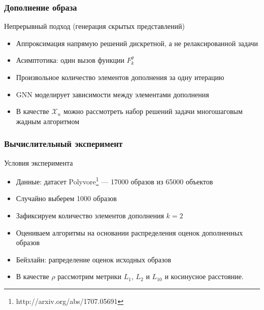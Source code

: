 \documentclass[10pt]{beamer}
\begin{document}
\begin{frame}
	\frametitle{Дополнение образа}
	\begin{block}{Непрерывный подход (генерация скрытых представлений)}
		\begin{itemize}
			\item Аппроксимация напрямую решений дискретной, а не релаксированной задачи
			\item Асимптотика: один вызов функции $F_k^\theta$
			\item Произвольное количество элементов дополнения за одну итерацию
			\item GNN моделирует зависимости между элементами дополнения
			\item В качестве $\mathcal{X}_n$ можно рассмотреть набор решений задачи многошаговым жадным алгоритмом
		\end{itemize}
	\end{block}
\end{frame}


\begin{frame}
	\frametitle{Вычислительный эксперимент}
	\begin{block}{Условия эксперимента}
		\begin{itemize}
			\item Данные: датасет Polyvore\footnote{http://arxiv.org/abs/1707.05691} --- 17000 образов из 65000 объектов
			\item Случайно выберем 1000 образов 
			\item Зафиксируем количество элементов дополнения $k=2$
			\item Оцениваем алгоритмы на основании распределения оценок дополненных образов
			\item Бейзлайн: рапределение оценок исходных образов
			\item В качестве $\rho$ рассмотрим метрики $L_1$, $L_2$ и $L_{10}$ и косинусное расстояние.
		\end{itemize}
	\end{block}
\end{frame}
\end{document}
